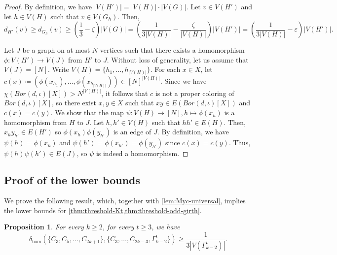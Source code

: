 \documentclass{article}
\newtheorem{proposition}[theorem]{Proposition}
\begin{document}
\begin{proof}
    By definition, we have $|V(H')| = |V(H)| \cdot |V(G)|$.
    Let $v \in V(H')$ and let $h \in V(H)$ such that $v \in V(G_h)$.
    Then, \[d_{H'}(v) \geq d_{G_h}(v) \geq \left(\frac{1}{3} - \zeta\right)|V(G)| = \left(\frac{1}{3|V(H)|} - \frac{\zeta}{|V(H)|}\right)|V(H')| = \left(\frac{1}{3|V(H)|} - \varepsilon\right)|V(H')|.\]

    Let $J$ be a graph on at most $N$ vertices such that there exists a homomorphism $\phi : V(H') \to V(J)$ from $H'$ to $J$.
    Without loss of generality, let us assume that $V(J) = [N]$.
    Write $V(H) = \{h_1, \ldots, h_{|V(H)|}\}$.
    For each $x \in X$, let $c(x) \coloneqq (\phi(x_{h_1}), \ldots, \phi(x_{h_{|V(H)|}})) \in [N]^{|V(H)|}$.
    Since we have $\chi(Bor(d, \iota)[X]) > N^{|V(H)|}$, it follows that $c$ is not a proper coloring of $Bor(d, \iota)[X]$, so there exist $x, y \in X$ such that $xy \in E(Bor(d, \iota)[X])$ and $c(x) = c(y)$.
    We show that the map $\psi : V(H) \to [N], h \mapsto \phi(x_h)$ is a homomorphism from $H$ to $J$.
    Let $h, h' \in V(H)$ such that $hh' \in E(H)$.
    Then, $x_hy_{h'} \in E(H')$ so $\phi(x_h)\phi(y_{h'})$ is an edge of $J$.
    By definition, we have $\psi(h) = \phi(x_h)$ and $\psi(h') = \phi(x_{h'}) = \phi(y_{h'})$ since $c(x) = c(y)$.
    Thus, $\psi(h)\psi(h') \in E(J)$, so $\psi$ is indeed a homomorphism.
\end{proof}

\subsection{Proof of the lower bounds}

We prove the following result, which, together with \cref{lem:Myc-universal}, implies the lower bounds for \cref{thm:threshold-Kt,thm:threshold-odd-girth}.

\begin{proposition}\label{proof:lowerbound}
    For every $k \geq 2$, for every $t \geq 3$, we have \[\delta_{\hom}(\{C_3, C_5, \ldots, C_{2k+1}\}, \{C_3, \ldots, C_{2k-3}, \Gamma_{k-2}^t\}) \geq \frac{1}{3|V(\Gamma_{k-2}^t)|}.\]
\end{proposition}
\end{document}
